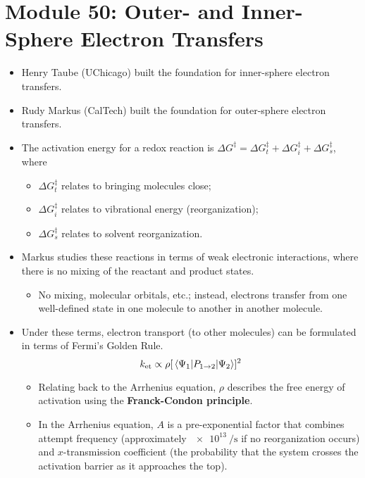 \documentclass[../notes.tex]{subfiles}
\begin{document}
\section{Module 50: Outer- and Inner-Sphere Electron Transfers}
\begin{itemize}
    \item Henry Taube (UChicago) built the foundation for inner-sphere electron transfers.
    \item Rudy Markus (CalTech) built the foundation for outer-sphere electron transfers.
    \item The activation energy for a redox reaction is $\Delta G^\ddagger=\Delta G^\ddagger_t+\Delta G^\ddagger_i+\Delta G^\ddagger_s$, where
    \begin{itemize}
        \item $\Delta G^\ddagger_t$ relates to bringing molecules close;
        \item $\Delta G^\ddagger_i$ relates to vibrational energy (reorganization);
        \item $\Delta G^\ddagger_s$ relates to solvent reorganization.
    \end{itemize}
    \item Markus studies these reactions in terms of weak electronic interactions, where there is no mixing of the reactant and product states.
    \begin{itemize}
        \item No mixing, molecular orbitals, etc.; instead, electrons transfer from one well-defined state in one molecule to another in another molecule.
    \end{itemize}
    \item Under these terms, electron transport (to other molecules) can be formulated in terms of Fermi's Golden Rule.
    \begin{equation*}
        k_\text{et} \propto \rho[\mel{\Psi_1}{P_{1\to 2}}{\Psi_2}]^2
    \end{equation*}
    \begin{itemize}
        \item Relating back to the Arrhenius equation, $\rho$ describes the free energy of activation using the \textbf{Franck-Condon principle}.
    \item In the Arrhenius equation, $A$ is a pre-exponential factor that combines attempt frequency (approximately $\SI{e13}{\per\second}$ if no reorganization occurs) and $x$-transmission coefficient (the probability that the system crosses the activation barrier as it approaches the top).

\end{itemize}
\end{itemize}
\end{document}
